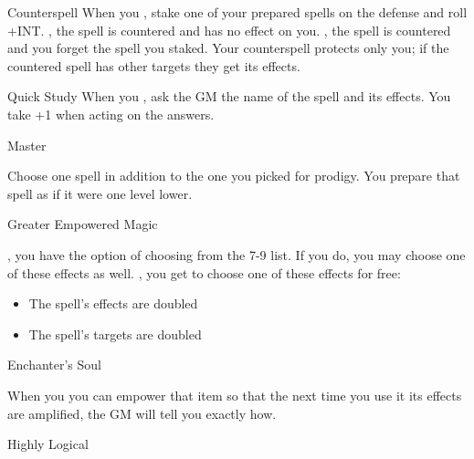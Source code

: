 \documentclass[8pt]{extarticle}
\begin{document}
\begin{multicols}{2}
\begin{amove}{Counterspell}
  When you , stake one of your prepared spells on the
  defense and roll +INT. \onSuccess, the spell is countered and has no
  effect on you. \onPartial, the spell is countered and you forget the
  spell you staked. Your counterspell protects only you; if the
  countered spell has other targets they get its effects.
\end{amove}

\begin{amove}{Quick Study}
  When you , ask the GM
  the name of the spell and its effects. You take +1 when acting on
  the answers.
\end{amove}


\vfill\null
\columnbreak

\secondAdvances

\begin{amove}{Master}

  Choose one spell in addition to the one you picked for prodigy. You
  prepare that spell as if it were one level lower.
\end{amove}

\begin{amove}{Greater Empowered Magic}

  , you have the option of choosing
  from the 7-9 list. If you do, you may choose one of these effects as
  well. \onMassiveSuccess, you get to choose one of these effects for
  free:

  \begin{itemize}
  \item The spell’s effects are doubled
  \item The spell’s targets are doubled
  \end{itemize}
\end{amove}

\begin{amove}{Enchanter’s Soul}

  When you  you can empower that item so that the next time
  you use it its effects are amplified, the GM will tell you exactly
  how.
\end{amove}

\begin{amove}{Highly Logical}


\end{amove}
\end{multicols}
\end{document}
